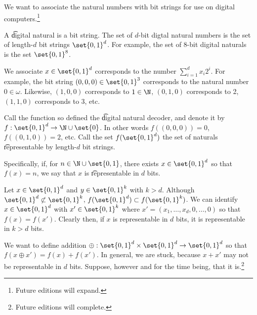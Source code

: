 

We want to associate the natural numbers with bit strings for use on digital computers.\footnote{Future editions will expand.}


A \t{digital natural} is a bit string.
The set of \t{$d$-bit digtal natural numbers} is the set of length-$d$ bit strings $\set{0, 1}^d$.
For example, the set of 8-bit digital naturals is the set $\set{0, 1}^8$.


We associate $x \in \set{0, 1}^d$ corresponds to the number $\sum_{i = 1}^{d} x_i 2^i$.
For example, the bit string $(0,0,0) \in \set{0, 1}^3$ corresponds to the natural number $0 \in \omega$.
Likewise, $(1, 0, 0)$ corresponds to $1 \in \N$, $(0, 1, 0)$ corresponds to 2, $(1, 1, 0)$ corresponds to 3, etc.

Call the function so defined the \t{digital natural decoder}, and denote it by $f: \set{0, 1}^d \to \N \cup \set{0}$.
In other words $f((0, 0, 0)) = 0$, $f((0, 1, 0)) = 2$, etc.
Call the set $f(\set{0, 1}^d)$ the set of naturals \t{representable} by length-$d$ bit strings.

Specifically, if, for $n \in \N \cup \set{0, 1}$, there exists $x \in \set{0, 1}^d$ so that $f(x) = n$, we say that $x$ is \t{representable in $d$ bits}.



Let $x \in \set{0, 1}^d$ and $y \in \set{0, 1}^k$ with $k > d$.
Although $\set{0, 1}^d \not\subset \set{0, 1}^k$, $f(\set{0, 1}^d) \subset f(\set{0, 1}^k)$.
We can identify $x \in \set{0, 1}^d$ with $x' \in \set{0, 1}^k$ where $x' = (x_1, \dots, x_d, 0, \dots, 0)$ so that $f(x) = f(x')$.
Clearly then, if $x$ is representable in $d$ bits, it is representable in $k > d$ bits.


We want to define addition $\oplus: \set{0, 1}^d \times \set{0, 1}^d \to \set{0, 1}^d$ so that $f(x \oplus x') = f(x) + f(x')$.
In general, we are stuck, because $x + x'$ may not be representable in $d$ bits.
Suppose, however and for the time being, that it is.\footnote{Future editions will complete.}


